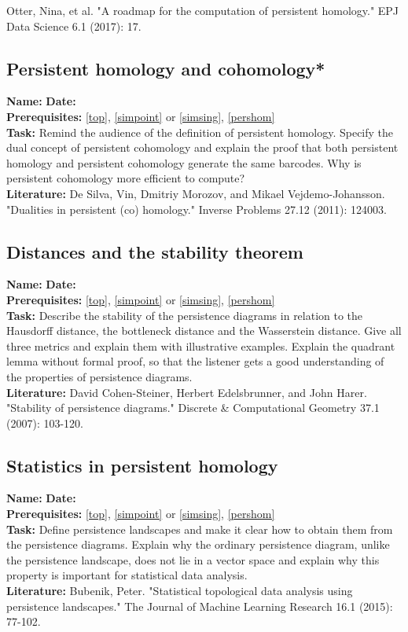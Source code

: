 \documentclass{article}
\begin{document}
Otter, Nina, et al. "A roadmap for the computation of persistent homology." EPJ Data Science 6.1 (2017): 17.

\subsection{Persistent homology and cohomology*}
\label{pershomcohom}
\textbf{Name:}  \hspace{4cm} \textbf{Date:} \\
\textbf{Prerequisites:} \ref{top}, \ref{simpoint} or \ref{simsing}, \ref{pershom}\\
\textbf{Task:} Remind the audience of the definition of persistent homology. Specify the dual concept of persistent cohomology and explain the proof that both persistent homology and persistent cohomology generate the same barcodes. Why is persistent cohomology more efficient to compute? \\
\textbf{Literature:}
De Silva, Vin, Dmitriy Morozov, and Mikael Vejdemo-Johansson. "Dualities in persistent (co) homology." Inverse Problems 27.12 (2011): 124003.

\subsection{Distances and the stability theorem}
\label{distances}
\textbf{Name:}  \hspace{4cm} \textbf{Date:} \\
\textbf{Prerequisites:} \ref{top}, \ref{simpoint} or \ref{simsing}, \ref{pershom}\\
\textbf{Task:} Describe the stability of the persistence diagrams in relation to the Hausdorff distance, the bottleneck distance and the Wasserstein distance. Give all three metrics and explain them with illustrative examples. Explain the quadrant lemma without formal proof, so that the listener gets a good understanding of the properties of persistence diagrams.\\
\textbf{Literature:}
David Cohen-Steiner, Herbert Edelsbrunner, and John Harer. "Stability of persistence diagrams." Discrete \& Computational Geometry 37.1 (2007): 103-120.

\subsection{Statistics in persistent homology}
\label{statistics}
\textbf{Name:} \hspace{4cm} \textbf{Date:}\\
\textbf{Prerequisites:} \ref{top}, \ref{simpoint} or \ref{simsing}, \ref{pershom}\\
\textbf{Task:} Define persistence landscapes and make it clear how to obtain them from the persistence diagrams. Explain why the ordinary persistence diagram, unlike the persistence landscape, does not lie in a vector space and explain why this property is important for statistical data analysis.\\
\textbf{Literature:}
Bubenik, Peter. "Statistical topological data analysis using persistence landscapes." The Journal of Machine Learning Research 16.1 (2015): 77-102.
\end{document}
